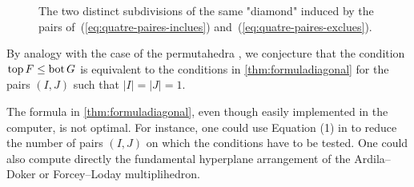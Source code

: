 \documentclass[twoside, 12pt]{amsart}
\theoremstyle{remark}
\begin{document}
\begin{figure}[h!]
\centering
{}
\caption{The two distinct subdivisions of the same "diamond" induced by the pairs of~(\ref{eq:quatre-paires-inclues}) and~(\ref{eq:quatre-paires-exclues}).}
\label{fig:diamonds}
\end{figure}

By analogy with the case of the permutahedra \cite[Proposition 3.17]{LA21}, we conjecture that the condition $\operatorname{top} F\leq \operatorname{bot} G$ is equivalent to the conditions in \cref{thm:formuladiagonal} for the pairs $(I,J)$ such that $|I|=|J|=1$. 

The formula in \cref{thm:formuladiagonal}, even though easily implemented in the computer, is not optimal. 
For instance, one could use Equation (1) in \cite[Theorem 1.23]{LA21} to reduce the number of pairs $(I,J)$ on which the conditions have to be tested. 
One could also compute directly the fundamental hyperplane arrangement of the Ardila--Doker or Forcey--Loday multiplihedron.
\end{document}
